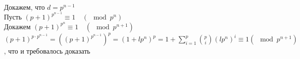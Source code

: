 		\\
		Докажем, что $d = p^{n - 1}$\\
		Пусть $(p + 1)^{p^{n-1}} \equiv 1 \quad (\mod p^n)$\\
		Докажем $(p + 1)^{p^{n}} \equiv 1 \quad (\mod p^{n+1})$\\
		$(p + 1)^{p \cdot p^{n - 1}} = ((p + 1)^{p^{n - 1}})^p = (1 + lp^n)^p = 1 + \sum^p_{i = 1} {p \choose i} (lp^n)^i \equiv 1 (\mod p^{n+1})$, что и требовалось доказать\\
	
	